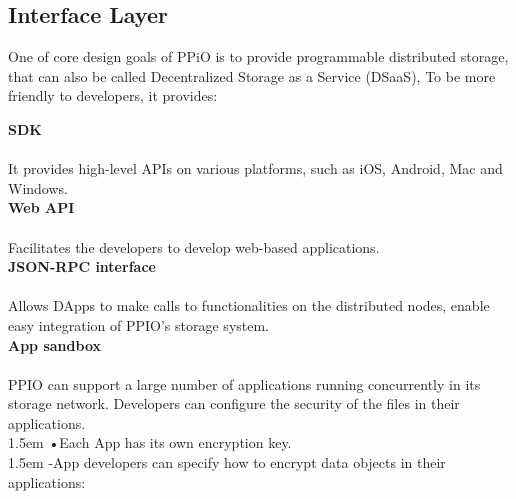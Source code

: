 \documentclass[10pt,a4paper]{article}
\begin{document}
     
        \subsection{Interface Layer}  %
One of core design goals of PPiO is to provide programmable distributed storage, that can also be called Decentralized Storage as a Service (DSaaS), To be more friendly to developers, it provides: \\
  \vspace{-0.5em}

\noindent   
{\bf SDK}
  \vspace{-0.8em}
\\\\It provides high-level APIs on various platforms, such as iOS, Android, Mac and Windows.
  \vspace{-0.5em}
\\

\noindent   
{\bf Web API}
  \vspace{-0.8em}
\\\\Facilitates the developers to develop web-based applications.
  \vspace{-0.5em}
\\

\noindent   
{\bf JSON-RPC interface}
  \vspace{-0.8em}
\\\\Allows DApps to make calls to functionalities on the distributed nodes, enable easy integration of PPIO’s storage system.
  \vspace{-0.5em}
\\

\noindent     
 {\bf App sandbox}
   \vspace{-0.8em}
\\\\
PPIO can support a large number of applications running concurrently in its storage network. Developers can configure the security of the files in their applications.
  \vspace{-0.8em}
\\

\hangindent 1.5em
\noindent   
•\quad Each App has its own encryption key.
  \vspace{-0.6em}
\\

\hangindent 1.5em
\noindent   
-\quad App developers can specify how to encrypt data objects in their applications:
  \vspace{-1em}
\\
\end{document}
